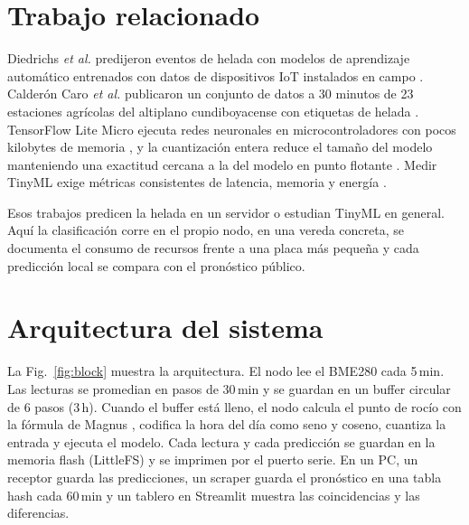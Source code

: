 \documentclass[conference]{IEEEtran}
\begin{document}
\section{Trabajo relacionado}
Diedrichs \textit{et al.} predijeron eventos de helada con modelos de aprendizaje autom\'atico entrenados con datos de dispositivos IoT instalados en campo \cite{diedrichs2018}. Calder\'on Caro \textit{et al.} publicaron un conjunto de datos a 30 minutos de 23 estaciones agr\'icolas del altiplano cundiboyacense con etiquetas de helada \cite{calderon2026,zenodo2026}. TensorFlow Lite Micro ejecuta redes neuronales en microcontroladores con pocos kilobytes de memoria \cite{david2021}, y la cuantizaci\'on entera reduce el tama\~no del modelo manteniendo una exactitud cercana a la del modelo en punto flotante \cite{jacob2018}. Medir TinyML exige m\'etricas consistentes de latencia, memoria y energ\'ia \cite{banbury2020}.

Esos trabajos predicen la helada en un servidor o estudian TinyML en general. Aqu\'i la clasificaci\'on corre en el propio nodo, en una vereda concreta, se documenta el consumo de recursos frente a una placa m\'as peque\~na y cada predicci\'on local se compara con el pron\'ostico p\'ublico.

\section{Arquitectura del sistema}
La Fig.~\ref{fig:block} muestra la arquitectura. El nodo lee el BME280 cada 5\,min. Las lecturas se promedian en pasos de 30\,min y se guardan en un buffer circular de 6 pasos (3\,h). Cuando el buffer est\'a lleno, el nodo calcula el punto de roc\'io con la f\'ormula de Magnus \cite{alduchov1996}, codifica la hora del d\'ia como seno y coseno, cuantiza la entrada y ejecuta el modelo. Cada lectura y cada predicci\'on se guardan en la memoria flash (LittleFS) y se imprimen por el puerto serie. En un PC, un receptor guarda las predicciones, un scraper guarda el pron\'ostico en una tabla hash cada 60\,min y un tablero en Streamlit muestra las coincidencias y las diferencias.
\end{document}
